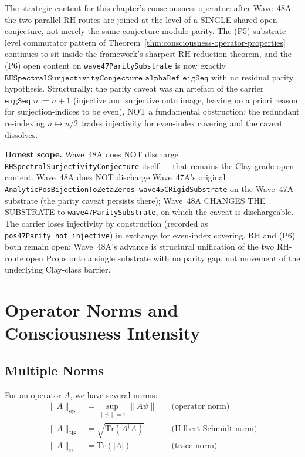\begin{remark}
\begin{itemize}
\end{itemize}
The strategic content for this chapter's consciousness operator: after Wave~48A the two parallel RH routes are joined at the level of a SINGLE shared open conjecture, not merely the same conjecture modulo parity. The (P5) substrate-level commutator pattern of Theorem~\ref{thm:consciousness-operator-properties} continues to sit inside the framework's sharpest RH-reduction theorem, and the (P6) open content on \texttt{wave47ParitySubstrate} is now exactly $\texttt{RHSpectralSurjectivityConjecture alphaRef eigSeq}$ with no residual parity hypothesis. Structurally: the parity caveat was an artefact of the carrier $\texttt{eigSeq } n := n + 1$ (injective and surjective onto image, leaving no a priori reason for surjection-indices to be even), NOT a fundamental obstruction; the redundant re-indexing $n \mapsto n/2$ trades injectivity for even-index covering and the caveat dissolves.

\textbf{Honest scope.} Wave~48A does NOT discharge \texttt{RHSpectralSurjectivityConjecture} itself --- that remains the Clay-grade open content. Wave~48A does NOT discharge Wave~47A's original \texttt{AnalyticPosBijectionToZetaZeros wave45CRigidSubstrate} on the Wave~47A substrate (the parity caveat persists there); Wave~48A CHANGES THE SUBSTRATE to \texttt{wave47ParitySubstrate}, on which the caveat is dischargeable. The carrier loses injectivity by construction (recorded as \texttt{pos47Parity\_not\_injective}) in exchange for even-index covering. RH and (P6) both remain open; Wave~48A's advance is structural unification of the two RH-route open Props onto a single substrate with no parity gap, not movement of the underlying Clay-class barrier.
\end{remark}

\section{Operator Norms and Consciousness Intensity}

\subsection{Multiple Norms}

For an operator $A$, we have several norms:
\begin{align}
\| A \|_{\text{op}} &= \sup_{\|\psi\|=1} \| A\psi \| \quad &\text{(operator norm)}\\
\| A \|_{\text{HS}} &= \sqrt{\text{Tr}(A^\dagger A)} \quad &\text{(Hilbert-Schmidt norm)}\\
\| A \|_{\text{tr}} &= \text{Tr}(|A|) \quad &\text{(trace norm)}
\end{align}

